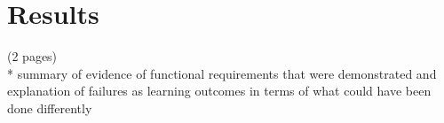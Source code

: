 \chapter{Results}

(2 pages)\\
* summary of evidence of functional requirements that were demonstrated and explanation of failures as learning outcomes in terms of what could have been done differently